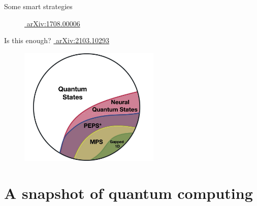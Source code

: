 \documentclass[aspectratio=169, 10pt, xcolor={svgnames}, hyperref={linkcolor=black}]{beamer}
\begin{document}
\begin{frame}{Some smart strategies}
\begin{multicols}{3}
\begin{figure}
{      \caption*{\href{https://arxiv.org/abs/1708.00006}{\faBook\,\,arXiv:1708.00006}}}%
   \end{figure}
   \end{multicols}
\end{frame}

\begin{frame}{Is this enough? \hfill \href{https://arxiv.org/abs/2103.10293}{\faBook\,\,arXiv:2103.10293}}
\pause
\begin{figure}
   \includegraphics[width=0.6\textwidth]{figures/complexity.jpg}
\end{figure}
\end{frame}

\section{A snapshot of quantum computing}
\end{document}
